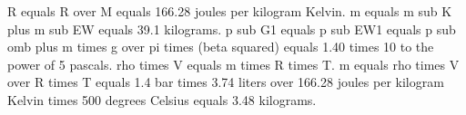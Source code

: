 R equals R over M equals 166.28 joules per kilogram Kelvin. m equals m sub K plus m sub EW equals 39.1 kilograms. p sub G1 equals p sub EW1 equals p sub omb plus m times g over pi times (beta squared) equals 1.40 times 10 to the power of 5 pascals. rho times V equals m times R times T. m equals rho times V over R times T equals 1.4 bar times 3.74 liters over 166.28 joules per kilogram Kelvin times 500 degrees Celsius equals 3.48 kilograms.